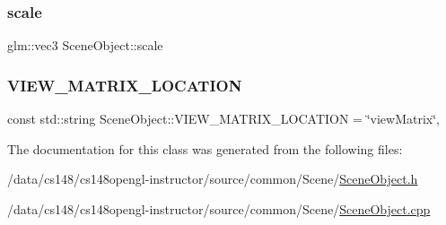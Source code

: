 \hypertarget{class_scene_object_a62c686b880fe4f58dec64a409e56de26}{}\label{class_scene_object_a62c686b880fe4f58dec64a409e56de26} 
\subsubsection{\texorpdfstring{scale}{scale}}
{\footnotesize\ttfamily glm\+::vec3 Scene\+Object\+::scale\hspace{0.3cm}{\ttfamily [protected]}}

\hypertarget{class_scene_object_a1c129ecdd6bd8e2f34c713f5dd183361}{}\label{class_scene_object_a1c129ecdd6bd8e2f34c713f5dd183361} 
\subsubsection{\texorpdfstring{V\+I\+E\+W\+\_\+\+M\+A\+T\+R\+I\+X\+\_\+\+L\+O\+C\+A\+T\+I\+ON}{VIEW\_MATRIX\_LOCATION}}
{\footnotesize\ttfamily const std\+::string Scene\+Object\+::\+V\+I\+E\+W\+\_\+\+M\+A\+T\+R\+I\+X\+\_\+\+L\+O\+C\+A\+T\+I\+ON = \char`\"{}view\+Matrix\char`\"{}\hspace{0.3cm}{\ttfamily [static]}, {\ttfamily [protected]}}



The documentation for this class was generated from the following files\+:\begin{DoxyCompactItemize}
\item 
/data/cs148/cs148opengl-\/instructor/source/common/\+Scene/\hyperlink{_scene_object_8h}{Scene\+Object.\+h}\item 
/data/cs148/cs148opengl-\/instructor/source/common/\+Scene/\hyperlink{_scene_object_8cpp}{Scene\+Object.\+cpp}\end{DoxyCompactItemize}
